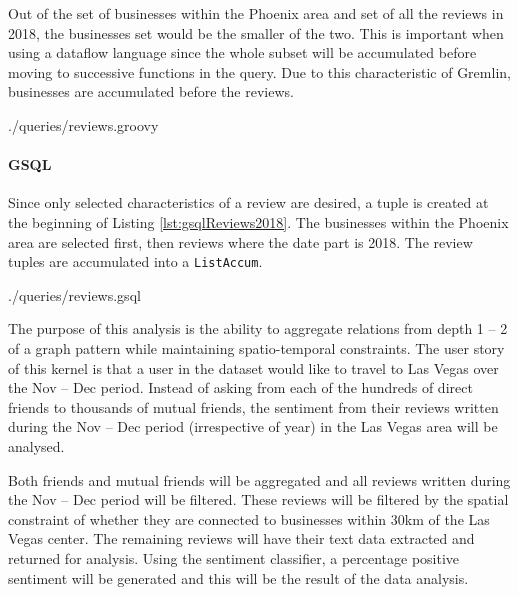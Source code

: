 Out of the set of businesses within the Phoenix area and set of all the reviews in 2018, the businesses set would be the smaller of the two. This is important when using a dataflow language since the whole subset will be accumulated before moving to successive functions in the query. Due to this characteristic of Gremlin, businesses are accumulated before the reviews.


{./queries/reviews.groovy}

\paragraph{GSQL}

Since only selected characteristics of a review are desired, a tuple is created at the beginning of Listing \ref{lst:gsqlReviews2018}. The businesses within the Phoenix area are selected first, then reviews where the date part is 2018. The review tuples are accumulated into a \texttt{ListAccum}.


{./queries/reviews.gsql}



The purpose of this analysis is the ability to aggregate relations from depth 1 -- 2 of a graph pattern while maintaining spatio-temporal constraints. The user story of this kernel is that a user in the dataset would like to travel to Las Vegas over the Nov -- Dec period. Instead of asking from each of the hundreds of direct friends to thousands of mutual friends, the sentiment from their reviews written during the Nov -- Dec period (irrespective of year) in the Las Vegas area will be analysed.

Both friends and mutual friends will be aggregated and all reviews written during the Nov -- Dec period will be filtered. These reviews will be filtered by the spatial constraint of whether they are connected to businesses within 30km of the Las Vegas center. The remaining reviews will have their text data extracted and returned for analysis. Using the sentiment classifier, a percentage positive sentiment will be generated and this will be the result of the data analysis.
